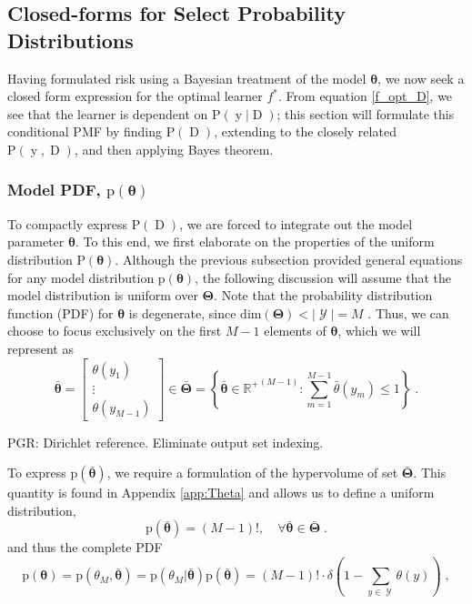 \documentclass[12pt]{report}
\DeclareMathOperator{\yrm}{\mathrm{y}}
\DeclareMathOperator{\Drm}{\mathrm{D}}
\DeclareMathOperator{\Ycal}{\mathcal{Y}}
\begin{document}
\subsection{Closed-forms for Select Probability Distributions}

Having formulated risk using a Bayesian treatment of the model $\bm{\theta}$, we now seek a closed form expression for the optimal learner $f^*$. From equation \eqref{f_opt_D}, we see that the learner is dependent on $\text{P}(\yrm | \Drm)$; this section will formulate this conditional PMF by finding $\text{P}(\Drm)$, extending to the closely related $\text{P}(\yrm,\Drm)$, and then applying Bayes theorem.


\subsubsection{Model PDF, $\text{p}(\bm{\theta})$}

To compactly express $\text{P}(\Drm)$, we are forced to integrate out the model parameter $\bm{\theta}$. To this end, we first elaborate on the properties of the uniform distribution $\text{P}(\bm{\theta})$. Although the previous subsection provided general equations for any model distribution $\text{p}(\bm{\theta})$, the following discussion will assume that the model distribution is uniform over $\bm{\Theta}$. Note that the probability distribution function (PDF) for $\bm{\theta}$ is degenerate, since $\text{dim}(\bm{\Theta}) < |\Ycal| = M$ . Thus, we can choose to focus exclusively on the first $M-1$ elements of $\bm{\theta}$, which we will represent as
\begin{equation}
\bar{\bm{\theta}} = \begin{bmatrix} \theta(y_1) \\ \vdots \\ \theta(y_{M-1}) \end{bmatrix} \in \bar{\bm{\Theta}} = \left\{ \bar{\bm{\theta}} \in {\mathbb{R}^+}^{(M-1)}: \sum_{m=1}^{M-1} \bar{\theta}(y_m) \leq 1 \right\} \;.
\end{equation}

PGR: Dirichlet reference. Eliminate output set indexing.

To express $\text{p}\left(\bar{\bm{\theta}}\right)$, we require a formulation of the hypervolume of set $\bar{\bm{\Theta}}$. This quantity is found in Appendix \ref{app:Theta} and allows us to define a uniform distribution,
\begin{equation}
\text{p}\left(\bar{\bm{\theta}}\right)= (M-1)!,  \quad \forall \bar{\bm{\theta}} \in \bar{\bm{\Theta}} \;.
\end{equation}
and thus the complete PDF
\begin{equation}
\text{p}(\bm{\theta}) = \text{p}(\theta_M,\bar{\bm{\theta}}) = \text{p}\left( \theta_M | \bar{\bm{\theta}} \right) \text{p}\left(\bar{\bm{\theta}}\right)
= (M-1)! \cdot \delta\left( 1 - \sum_{y \in \Ycal} \theta(y) \right) \;,
\end{equation}
\end{document}
